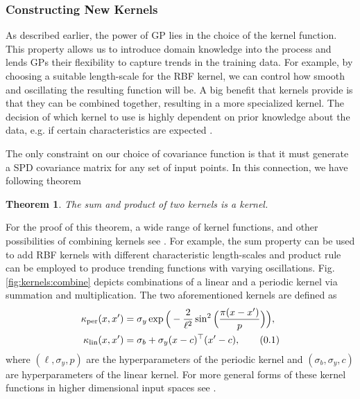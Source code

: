 \documentclass[10pt]{article}
\newtheorem{thm}{Theorem}[section]
\theoremstyle{definition}
\newcommand\eqnum{\addtocounter{equation}{1}\tag{\arabic{section}.\arabic{equation}}}
\begin{document}
\subsubsection{Constructing New Kernels}
As described earlier, the power of GP lies in the choice of the kernel function. This property allows us to introduce domain knowledge into the process and lends GPs their flexibility to capture trends in the training data. For example, by choosing a suitable length-scale for the RBF kernel, we can control how smooth and oscillating the resulting function will be. A big benefit that kernels provide is that they can be combined together, resulting in a more specialized kernel. The decision of which kernel to use is highly dependent on prior knowledge about the data, e.g. if certain characteristics are expected \cite{Gortler2019}.

The only constraint on our choice of covariance function is that it must generate a SPD covariance matrix for any set of input points. In this connection, we have following theorem
\begin{thm}
The sum and product of two kernels is a kernel.
\end{thm}
For the proof of this theorem, a wide range of kernel functions, and other possibilities of combining kernels see \cite[Section 4.2]{Rasmussen2006}. For example, the sum property can be used to add RBF kernels with different characteristic length-scales and product rule can be employed to produce trending functions with varying oscillations. Fig. \ref{fig:kernels:combine} depicts combinations of a linear and a periodic kernel via summation and multiplication. The two aforementioned kernels are defined as
\begin{align*}
\kappa_{\text{per}}(x,x') &= \sigma_y\exp\Big(-\frac{2}{\ell^2}\sin^2\Big(\frac{\pi( x-x')}{p}\Big)\Big), \\
\kappa_{\text{lin}}(x, x') &= \sigma_b+\sigma_y(x-c)^{\top}(x'-c),
\eqnum
\end{align*}
where $(\ell, \sigma_y, p)$ are the hyperparameters of the periodic kernel and $(\sigma_b, \sigma_y, c)$ are hyperparameters of the linear kernel. For more general forms of these kernel functions in higher dimensional input spaces see \cite[Section 45.4]{MacKay2003}.
\end{document}
